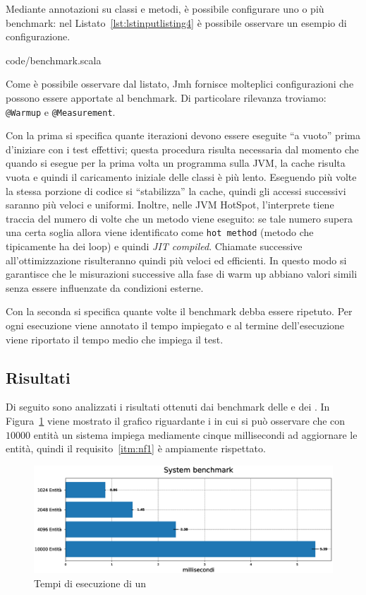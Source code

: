 Mediante annotazioni su classi e metodi, è possibile configurare uno o più benchmark: nel
Listato~\ref{lst:lstinputlisting4} è possibile osservare un esempio di configurazione.


{code/benchmark.scala}

Come è possibile osservare dal listato, Jmh fornisce molteplici configurazioni che possono essere apportate al
benchmark.
Di particolare rilevanza troviamo: \texttt{@Warmup} e \texttt{@Measurement}.

Con la prima si specifica quante iterazioni devono essere eseguite ``a vuoto'' prima d'iniziare con i test effettivi;
questa procedura risulta necessaria dal momento che quando si esegue per la prima volta un programma sulla JVM, la cache
risulta vuota e quindi il caricamento iniziale delle classi è più lento.
Eseguendo più volte la stessa porzione di codice si ``stabilizza'' la cache, quindi gli accessi successivi saranno più
veloci e uniformi.
Inoltre, nelle JVM HotSpot, l'interprete tiene traccia del numero di volte che un metodo viene eseguito: se tale
numero supera una certa soglia allora viene identificato come \texttt{hot method} (metodo che tipicamente ha dei
loop) e quindi \textit{JIT compiled}.
Chiamate successive all'ottimizzazione risulteranno quindi più veloci ed efficienti.
In questo modo si garantisce che le misurazioni successive alla fase di warm up abbiano valori simili senza essere
influenzate da condizioni esterne.

Con la seconda si specifica quante volte il benchmark debba essere ripetuto.
Per ogni esecuzione viene annotato il tempo impiegato e al termine dell'esecuzione viene riportato il tempo medio che
impiega il test.

\subsection{Risultati}\label{subsec:risultati}
Di seguito sono analizzati i risultati ottenuti dai benchmark delle \View e dei \System.
In Figura~\ref{fig:system} viene mostrato il grafico riguardante i \System in cui si può osservare che con $10000$
entità un sistema impiega mediamente cinque millisecondi ad aggiornare le entità, quindi il requisito~\ref{itm:nf1} è
ampiamente rispettato.

\begin{figure}[H]
    \centering
    \includegraphics[width=\textwidth]{./img/system-benchmark}
    \caption{Tempi di esecuzione di un \System}\label{fig:system}
\end{figure}

